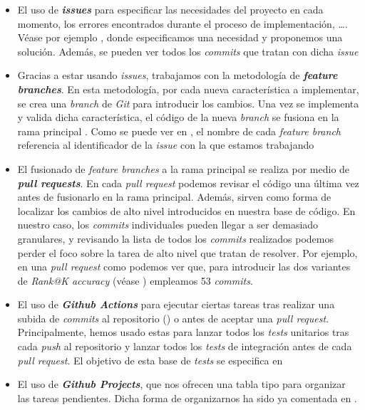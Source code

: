 \begin{itemize}
    \item El uso de \textbf{\textit{issues}} para especificar las necesidades del proyecto en cada momento, los errores encontrados durante el proceso de implementación, \ldots. Véase por ejemplo \cite{informatica:ejemplo_issue_14}, donde especificamos una necesidad y proponemos una solución. Además, se pueden ver todos los \textit{commits} que tratan con dicha \textit{issue}
    \item Gracias a estar usando \textit{issues}, trabajamos con la metodología de \textbf{\textit{feature branches}}. En esta metodología, por cada nueva característica a implementar, se crea una \textit{branch} de \textit{Git} para introducir los cambios. Una vez se implementa y valida dicha característica, el código de la nueva \textit{branch} se fusiona en la rama principal \cite{informatica:feature_branches}. Como se puede ver en \cite{informatica:repogithub}, el nombre de cada \textit{feature branch} referencia al identificador de la \textit{issue} con la que estamos trabajando
    \item El fusionado de \textit{feature branches} a la rama principal se realiza por medio de \textbf{\textit{pull requests}}. En cada \textit{pull request} podemos revisar el código una última vez antes de fusionarlo en la rama principal. Además, sirven como forma de localizar los cambios de alto nivel introducidos en nuestra base de código. En nuestro caso, los \textit{commits} individuales pueden llegar a ser demasiado granulares, y revisando la lista de todos los \textit{commits} realizados podemos perder el foco sobre la tarea de alto nivel que tratan de resolver. Por ejemplo, en una \textit{pull request} como \cite{informatica:ejemplo_pr_57} podemos ver que, para introducir las dos variantes de \textit{Rank@K accuracy} (véase ) empleamos 53 \textit{commits}.
    \item El uso de \textbf{\textit{Github Actions}} para ejecutar ciertas tareas tras realizar una subida de \textit{commits} al repositorio () o antes de aceptar una \textit{pull request}. Principalmente, hemos usado estas  para lanzar todos los \textit{tests} unitarios tras cada \textit{push} al repositorio y lanzar todos los \textit{tests} de integración antes de cada \textit{pull request}. El objetivo de esta base de \textit{tests} se especifica en 
    \item El uso de \textbf{\textit{Github Projects}}, que nos ofrecen una tabla tipo  para organizar las tareas pendientes. Dicha forma de organizarnos ha sido ya comentada en .
\end{itemize}

